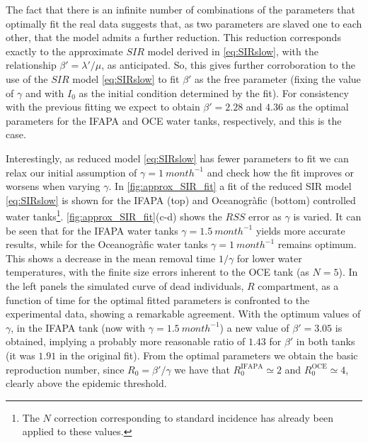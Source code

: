 The fact that there is an infinite number of combinations of the parameters
that optimally fit the real data suggests that, as two parameters are slaved
one to each other, that the model
admits a further reduction. This reduction corresponds exactly to the
approximate $SIR$ model derived in \cref{eq:SIRslow}, with the relationship
$\beta'=\lambda'/\mu$, as anticipated. So, this gives further corroboration to
the use of the $SIR$ model \cref{eq:SIRslow} to fit $\beta'$ as the free
parameter (fixing the value of $\gamma$ and with $I_0$ as the initial condition
determined by the fit). For consistency with the previous fitting we expect to
obtain $\beta'=2.28$ and $4.36$ as the optimal parameters for the IFAPA and OCE
water tanks, respectively, and this is the case.

Interestingly, as reduced model \cref{eq:SIRslow} has fewer parameters to
fit we can relax our initial assumption of $\gamma=\SI{1}{month^{-1}}$ and
check how the fit improves or worsens when varying $\gamma$.
In \cref{fig:approx_SIR_fit} a fit of the reduced SIR model
\cref{eq:SIRslow} is shown for the IFAPA (top) and Oceanogràfic (bottom)
controlled water tanks\footnote{The $N$ correction corresponding to standard
    incidence has already been applied to these values.}.
\cref{fig:approx_SIR_fit}(c-d) shows the $RSS$ error as $\gamma$ is varied.
It can be seen that for the IFAPA water tanks $\gamma=\SI{1.5}{month^{-1}}$
yields more accurate results, while for the Oceanogràfic water tanks
$\gamma=\SI{1}{month^{-1}}$ remains optimum. This shows a decrease in the mean
removal time $1/\gamma$ for lower water temperatures, with the finite size
errors inherent to the OCE tank (as $N=5$).
In the left panels the simulated curve of dead individuals, $R$
compartment, as a function of time for the optimal fitted parameters is
confronted to the experimental data, showing a remarkable agreement. With the
optimum values of $\gamma$, in the IFAPA tank (now with
$\gamma=\SI{1.5}{month^{-1}}$) a new value of $\beta'=3.05$ is obtained,
implying a probably more reasonable ratio of $1.43$ for $\beta'$ in both tanks
(it was $1.91$ in the original fit).
From the optimal parameters we obtain the basic reproduction number, since
$R_0=\beta'/\gamma$ we have that $R_0^{\textrm{IFAPA}}\simeq2$ and
$R_0^{\textrm{OCE}}\simeq4$, clearly above the epidemic threshold.

